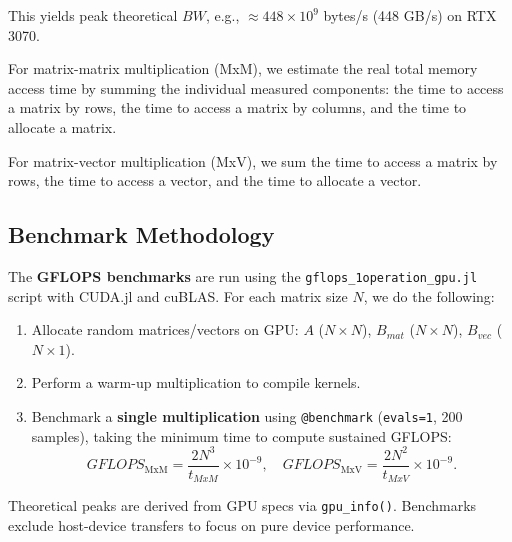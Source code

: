 This yields peak theoretical $BW$, e.g., $\approx 448 \times 10^9$ bytes/s (448 GB/s) on RTX 3070. 

For matrix-matrix multiplication (MxM), we estimate the real total memory access time by summing the individual measured components: the time to access a matrix by rows, the time to access a matrix by columns, and the time to allocate a matrix.

For matrix-vector multiplication (MxV), we sum the time to access a matrix by rows, the time to access a vector, and the time to allocate a vector.

\clearpage

\subsection{Benchmark Methodology}

The \textbf{GFLOPS benchmarks} are run using the \texttt{gflops\_1operation\_gpu.jl} script with CUDA.jl and cuBLAS. For each matrix size $N$, we do the following:
\begin{enumerate}
    \item Allocate random matrices/vectors on GPU: $A$ ($N \times N$), $B_{mat}$ ($N \times N$), $B_{vec}$ ($N \times 1$).
    \item Perform a warm-up multiplication to compile kernels.
    \item Benchmark a \textbf{single multiplication} using \texttt{@benchmark} (\texttt{evals=1}, 200 samples), taking the minimum time to compute sustained GFLOPS:
    \[
    GFLOPS_{\mathrm{MxM}} = \frac{2 N^3}{t_{MxM}} \times 10^{-9}, \quad GFLOPS_{\mathrm{MxV}} = \frac{2 N^2}{t_{MxV}} \times 10^{-9}.
    \]
\end{enumerate}

Theoretical peaks are derived from GPU specs via \texttt{gpu\_info()}. Benchmarks exclude host-device transfers to focus on pure device performance.


